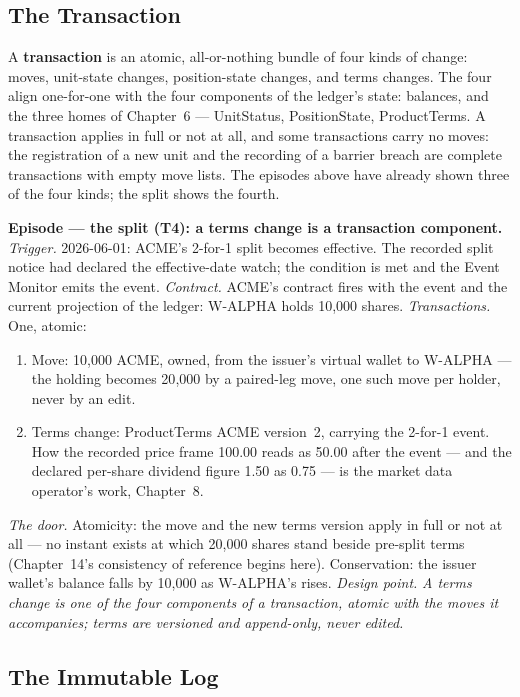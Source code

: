 \documentclass[11pt,a4paper]{article}
\begin{document}
\subsection{The Transaction}

A \textbf{transaction} is an atomic, all-or-nothing bundle of four kinds of change:
moves, unit-state changes, position-state changes, and terms changes. The four align
one-for-one with the four components of the ledger's state: balances, and the three
homes of Chapter~6 --- UnitStatus, PositionState, ProductTerms. A transaction applies in
full or not at all, and some transactions carry no moves: the registration of a new unit
and the recording of a barrier breach are complete transactions with empty move lists.
The episodes above have already shown three of the four kinds; the split shows the
fourth.

\medskip\noindent\textbf{Episode --- the split (T4): a terms change is a transaction
component.}
\emph{Trigger.} 2026-06-01: ACME's 2-for-1 split becomes effective. The recorded split
notice had declared the effective-date watch; the condition is met and the Event Monitor
emits the event.
\emph{Contract.} ACME's contract fires with the event and the current projection of the
ledger: W-ALPHA holds 10{,}000 shares.
\emph{Transactions.} One, atomic:
\begin{enumerate}[nosep,leftmargin=2.2em]
\item Move: 10{,}000 ACME, owned, from the issuer's virtual wallet to W-ALPHA --- the
  holding becomes 20{,}000 by a paired-leg move, one such move per holder, never by an
  edit.
\item Terms change: ProductTerms ACME version~2, carrying the 2-for-1 event. How the
  recorded price frame 100.00 reads as 50.00 after the event --- and the declared
  per-share dividend figure 1.50 as 0.75 --- is the market data operator's work,
  Chapter~8.
\end{enumerate}
\emph{The door.} Atomicity: the move and the new terms version apply in full or not at
all --- no instant exists at which 20{,}000 shares stand beside pre-split terms
(Chapter~14's consistency of reference begins here). Conservation: the issuer wallet's
balance falls by 10{,}000 as W-ALPHA's rises.
\emph{Design point.} \emph{A terms change is one of the four components of a
transaction, atomic with the moves it accompanies; terms are versioned and append-only,
never edited.}

\subsection{The Immutable Log}
\end{document}
